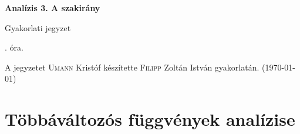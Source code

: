 \documentclass[a4paper,11.5pt]{article}
\begin{document}
	\setlength\parindent{0pt}
	\def\a{\textbf{a}}
	\def\b{\textbf{b}}
	\def\N{\hskip 10 true mm}
	\def\a{\textbf{a}}
	\def\b{\textbf{b}}
	\def\c{\textbf{c}}
	\def\d{\textbf{d}}
	\def\e{\textbf{e}}
	\def\gg{$\gamma$}
	\def\vi{\textbf{i}}
	\def\jj{\textbf{j}}
	\def\kk{\textbf{k}}
	\def\fh{\overrightarrow}
	\def\l{\lambda}
	\def\m{\mu}
	\def\v{\textbf{v}}
	\def\0{\textbf{0}}
	\def\s{\hspace{0.2mm}\vphantom{\beta}}
	\def\Z{\mathbb{Z}}
	\def\Q{\mathbb{Q}}
	\def\R{\mathbb{R}}
	\def\C{\mathbb{C}}
	\def\N{\mathbb{N}}
	\def\Rn{\mathbb{R}^{n}}
	\def\Ra{\overline{\mathbb{R}}}
	\def\sume{\displaystyle\sum_{n=1}^{+\infty}}
	\def\sumn{\displaystyle\sum_{n=0}^{+\infty}}
	\def\biz{\emph{Bizonyítás:\ }}
	\def\narrow{\underset{n\rightarrow+\infty}{\longrightarrow}}
	\def\limn{\displaystyle\lim_{n\to +\infty}}
	
	\theoremstyle{definition}
	\newtheorem{theorem}{Tétel}[subsubsection] %
	
	\theoremstyle{definition}
	\newtheorem{definition}[theorem]{Definíció} %
	\newtheorem{example}[theorem]{Példa} %
	\newtheorem{exercise}[theorem]{Házi feladat} %
	\newtheorem{note}[theorem]{Megjegyzés} %
	\newtheorem{task}[theorem]{Feladat} %
	\newtheorem{revision}[theorem]{Emlékeztető} %
	\begin{center}
		{\LARGE\textbf{Analízis 3. A szakirány}}
		\smallskip
		
		{\Large Gyakorlati jegyzet}
		
		. óra.
	\end{center}
	A jegyzetet \textsc{Umann} Kristóf készítette \textsc{Filipp} Zoltán István gyakorlatán. (\today)
	\section{Többáváltozós függvények analízise}
\end{document}
